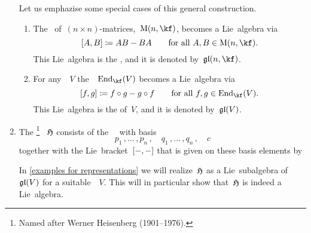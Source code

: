 \begin{examples}
\begin{enumerate}
			Let us emphazise some special cases of this general construction.
			\begin{enumerate}
				\item
					The~{\algebra{$\kf$}} of~$(n \times n)$-matrices,~$\Mat(n, \kf)$, becomes a Lie~algebra via
					\[
						[A,B]
						\defined
						AB - BA
						\qquad
						\text{for all~$A, B \in \Mat(n, \kf)$.}
					\]
					This Lie~algebra is the , and it is denoted by~$\gllie(n, \kf)$.
				\item
					For any~{\vectorspace{$\kf$}}~$V$ the~{\algebra{$\kf$}}~$\End_{\kf}(V)$ becomes a Lie~algebra via
					\[
						[f, g]
						\defined
						f \circ g - g \circ f
						\qquad
						\text{for all~$f, g \in \End_{\kf}(V)$.}
					\]
					This Lie~algebra is the  of~$V$, and it is denoted by~$\mathfrak{gl}(V)$.
			\end{enumerate}
		\item
			The %
			\footnote{
				Named after Werner Heisenberg (1901--1976).
			}%
			~$\mathfrak{H}$ consists of the~~{\vectorspace{$\kf$}} with basis
			\[
				p_1 \,, \dotsc \,, p_n \,,
				\quad
				q_1 \,, \dotsc \,, q_n \,,
				\quad
				c
				\label{heisenberg basis}
			\]
			together with the Lie~bracket~$[-, -]$ that is given on these basis elements by
			In \cref{examples for representations} we will realize~$\mathfrak{H}$ as a Lie~subalgebra of~$\mathfrak{gl}(V)$ for a suitable~\vectorspace{$\kf$}~$V$.
			This will in particular show that~$\mathfrak{H}$ is indeed a Lie~algebra.
	\end{enumerate}
\end{examples}


